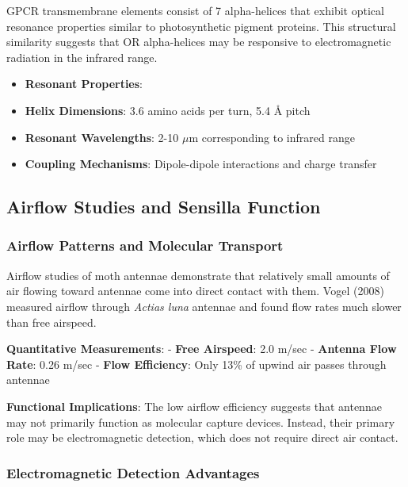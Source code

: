 \documentclass[
  13pt,
  a4paperpaper,
  12pt]{article}
\providecommand{\tightlist}{%
  \setlength{\itemsep}{0pt}\setlength{\parskip}{0pt}}
\begin{document}
GPCR transmembrane elements consist of 7 alpha-helices that exhibit
optical resonance properties similar to photosynthetic pigment proteins.
This structural similarity suggests that OR alpha-helices may be
responsive to electromagnetic radiation in the infrared range.

\begin{itemize}
\tightlist
\item
  \textbf{Resonant Properties}:
\item
  \textbf{Helix Dimensions}: 3.6 amino acids per turn, 5.4 \AA{} pitch
\item
  \textbf{Resonant Wavelengths}: 2-10 \(\mu\mathrm{m}\) corresponding to
  infrared range
\item
  \textbf{Coupling Mechanisms}: Dipole-dipole interactions and charge
  transfer
\end{itemize}

\subsection{Airflow Studies and Sensilla
Function}\label{airflow-studies-and-sensilla-function}

\subsubsection{Airflow Patterns and Molecular
Transport}\label{airflow-patterns-and-molecular-transport}

Airflow studies of moth antennae demonstrate that relatively small
amounts of air flowing toward antennae come into direct contact with
them. Vogel (2008) measured airflow through \emph{Actias luna} antennae
and found flow rates much slower than free airspeed.

\textbf{Quantitative Measurements}: - \textbf{Free Airspeed}: 2.0 m/sec
- \textbf{Antenna Flow Rate}: 0.26 m/sec - \textbf{Flow Efficiency}:
Only 13\% of upwind air passes through antennae

\textbf{Functional Implications}: The low airflow efficiency suggests
that antennae may not primarily function as molecular capture devices.
Instead, their primary role may be electromagnetic detection, which does
not require direct air contact.

\subsubsection{Electromagnetic Detection
Advantages}\label{electromagnetic-detection-advantages}
\end{document}
